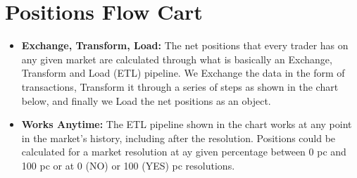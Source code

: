 \documentclass{article}
\begin{document}
\section{Positions Flow Cart}

\begin{itemize}
    \item \textbf{Exchange, Transform, Load:} The net positions that every trader has on any given market are calculated through what is basically an Exchange, Transform and Load (ETL) pipeline. We Exchange the data in the form of transactions, Transform it through a series of steps as shown in the chart below, and finally we Load the net positions as an object.
    \item \textbf{Works Anytime:} The ETL pipeline shown in the chart works at any point in the market's history, including after the resolution. Positions could be calculated for a market resolution at ay given percentage between 0 pc and 100 pc or at 0 (NO) or 100 (YES) pc resolutions.
\end{itemize}
\end{document}
